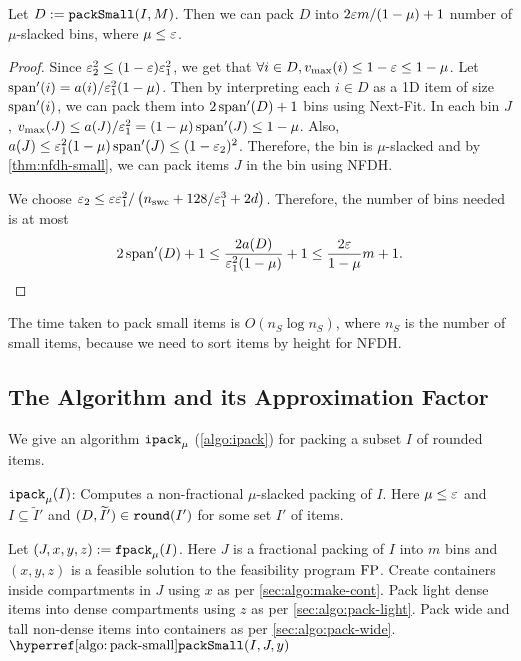 \begin{lemma}
Let $D := \operatorname{\mathtt{packSmall}}(I, M)$. Then we can pack $D$ into
$2\varepsilon m/(1-\mu) + 1$ number of
$\mu$-slacked bins, where $\mu \le \varepsilon$.
\end{lemma}
\begin{proof}
Since $\varepsilon_2^2 \le (1-\varepsilon)\varepsilon_1^2$, we get that
$\forall i \in D, v_{\max}(i) \le 1-\varepsilon \le 1-\mu$.
Let $\operatorname{span}'(i) = a(i)/\varepsilon_1^2(1-\mu)$. Then by interpreting each $i \in D$ as a 1D item
of size $\operatorname{span}'(i)$, we can pack them into $2\operatorname{span}'(D) + 1$ bins using Next-Fit.
In each bin $J$,
$v_{\max}(J) \le a(J)/\varepsilon_1^2 = (1-\mu)\operatorname{span}'(J) \le 1-\mu$.
Also, $a(J) \le \varepsilon_1^2(1-\mu)\operatorname{span}'(J) \le (1-\varepsilon_2)^2$.
Therefore, the bin is $\mu$-slacked and by \cref{thm:nfdh-small},
we can pack items $J$ in the bin using NFDH.

We choose
$\varepsilon_2 \le \varepsilon\varepsilon_1^2/\left(n_{\mathrm{swc}} + 128/\varepsilon_1^3 + 2d\right)$.
Therefore, the number of bins needed is at most
\[ 2\operatorname{span}'(D) + 1 \le \frac{2a(D)}{\varepsilon_1^2(1-\mu)} + 1
\le \frac{2\varepsilon}{1-\mu} m + 1 \qedhere. \]
\end{proof}

The time taken to pack small items is $O(n_S \log n_S)$, where $n_S$ is the
number of small items, because we need to sort items by height for NFDH.

\subsection{The Algorithm and its Approximation Factor}

We give an algorithm $\operatorname{\mathtt{ipack}}_{\mu}$ (\cref{algo:ipack}) for packing a subset $I$ of rounded items.

\begin{algorithm}[htb]
\caption{$\operatorname{\mathtt{ipack}}_{\mu}(I)$: Computes a non-fractional $\mu$-slacked packing of $I$.
Here $\mu \le \varepsilon$ and $I \subseteq \widetilde{I}'$ and $(D, \widetilde{I}') \in \operatorname{\mathtt{round}}(I')$
for some set $I'$ of items.}
\label{algo:ipack}
\begin{algorithmic}[1]
\State Let $(J, x, y, z) := \operatorname{\mathtt{fpack}}_{\mu}(I)$. Here $J$ is a fractional packing of $I$ into $m$ bins
and $(x, y, z)$ is a feasible solution to the feasibility program $\operatorname{FP}$.
\State Create containers inside compartments in $J$ using $x$ as per \cref{sec:algo:make-cont}.
\State Pack light dense items into dense compartments using $z$ as per \cref{sec:algo:pack-light}.
\State Pack wide and tall non-dense items into containers as per \cref{sec:algo:pack-wide}.
\State $\packSmallHyp(I, J, y)$ 
\end{algorithmic}
\end{algorithm}

